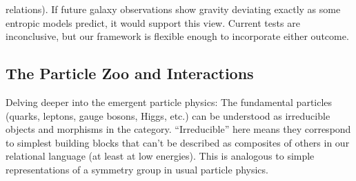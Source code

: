 \documentclass{article}
\begin{document}
\begin{description}
relations). If future galaxy observations show gravity deviating exactly as some entropic models predict, it would support this view. Current tests are inconclusive\cite{verlinde2016}, but our framework is flexible enough to incorporate either outcome.
\end{description}

\subsection{The Particle Zoo and Interactions}

Delving deeper into the emergent particle physics: The fundamental particles (quarks, leptons, gauge bosons, Higgs, etc.) can be understood as irreducible objects and morphisms in the category. “Irreducible” here means they correspond to simplest building blocks that can’t be described as composites of others in our relational language (at least at low energies). This is analogous to simple representations of a symmetry group in usual particle physics.
\end{document}
